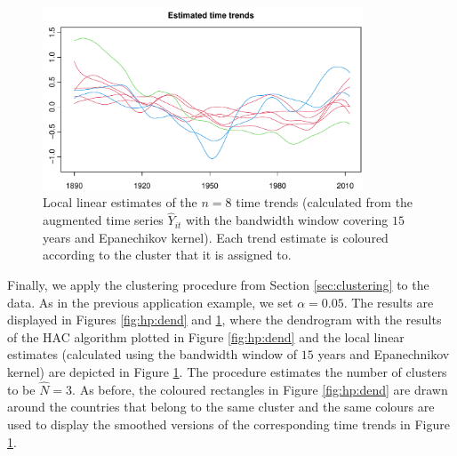 \documentclass[a4paper,12pt]{article}
\begin{document}
{\begin{figure}[t!]
\begin{center}
\includegraphics[width=0.85\textwidth]{output/plots/hp/all_clusters}
\caption{Local linear estimates of the $n=8$ time trends (calculated from the augmented time series $\widehat{Y}_{it}$ with the bandwidth window covering $15$ years and Epanechikov kernel). Each trend estimate is coloured according to the cluster that it is assigned to. }\label{fig:hp:all_clusters}
\end{center}
\end{figure}









Finally, we apply the clustering procedure from Section \ref{sec:clustering} to the data. As in the previous application example, we set $\alpha = 0.05$. The results are displayed in Figures \ref{fig:hp:dend} and \ref{fig:hp:all_clusters}, where the dendrogram with the results of the HAC algorithm plotted in Figure \ref{fig:hp:dend} and the local linear estimates (calculated using the bandwidth window of $15$ years and Epanechnikov kernel) are depicted in Figure \ref{fig:hp:all_clusters}. The procedure estimates the number of clusters to be $\widehat{N} = 3$. As before, the coloured rectangles in Figure \ref{fig:hp:dend} are drawn around the countries that belong to the same cluster and the same colours are used to display the smoothed versions of the corresponding time trends in Figure \ref{fig:hp:all_clusters}.

}
\end{document}
